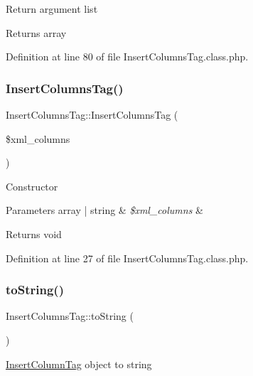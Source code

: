 Return argument list

\begin{DoxyReturn}{Returns}
array 
\end{DoxyReturn}


Definition at line 80 of file Insert\+Columns\+Tag.\+class.\+php.

\hypertarget{classInsertColumnsTag_a4d414adeb3714b646e7a55fc6b446c2c}{}\label{classInsertColumnsTag_a4d414adeb3714b646e7a55fc6b446c2c} 
\subsubsection{\texorpdfstring{Insert\+Columns\+Tag()}{InsertColumnsTag()}}
{\footnotesize\ttfamily Insert\+Columns\+Tag\+::\+Insert\+Columns\+Tag (\begin{DoxyParamCaption}\item[{}]{\$xml\+\_\+columns }\end{DoxyParamCaption})}

Constructor


\begin{DoxyParams}[1]{Parameters}
array | string & {\em \$xml\+\_\+columns} & \\
\hline
\end{DoxyParams}
\begin{DoxyReturn}{Returns}
void 
\end{DoxyReturn}


Definition at line 27 of file Insert\+Columns\+Tag.\+class.\+php.

\hypertarget{classInsertColumnsTag_aa18eef08112bb20ab2d77b26270e40ea}{}\label{classInsertColumnsTag_aa18eef08112bb20ab2d77b26270e40ea} 
\subsubsection{\texorpdfstring{to\+String()}{toString()}}
{\footnotesize\ttfamily Insert\+Columns\+Tag\+::to\+String (\begin{DoxyParamCaption}{ }\end{DoxyParamCaption})}

\hyperlink{classInsertColumnTag}{Insert\+Column\+Tag} object to string


